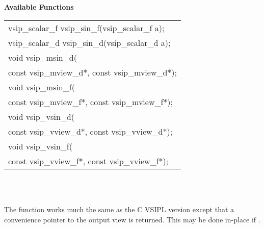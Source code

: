 \\\cvsiplh
\\ \hspace*{.04\textwidth} \vspace*{.005\textheight}\textbf{Available Functions }
\\ \hspace*{.04\textwidth} {
\ttfamily
\begin{tabular}[H]{l}
vsip\_scalar\_f vsip\_sin\_f(vsip\_scalar\_f a);\\
vsip\_scalar\_d vsip\_sin\_d(vsip\_scalar\_d a);\\
void vsip\_msin\_d(\\*
\hspace{1cm}const vsip\_mview\_d*, const vsip\_mview\_d*);\\
void vsip\_msin\_f(\\*
\hspace{1cm}const vsip\_mview\_f*, const vsip\_mview\_f*);\\
void vsip\_vsin\_d(\\*
\hspace{1cm}const vsip\_vview\_d*, const vsip\_vview\_d*);\\
void vsip\_vsin\_f(\\*
\hspace{1cm}const vsip\_vview\_f*, const vsip\_vview\_f*);\\
\end{tabular}
}
\\\pyjvsiph
{}
\\\hspace*{.06\textwidth}\parbox{.93\textwidth}{\vspace*{.005\textheight}The  function works much the same as the C VSIPL version except that a convenience pointer to the output view is returned. This may be done in-place if .}
